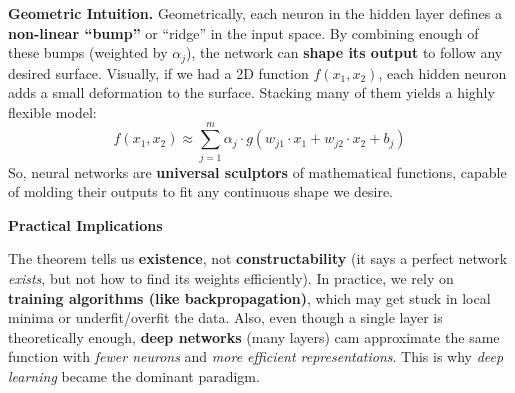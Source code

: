 \highspace
\textcolor{Green3}{ \textbf{Geometric Intuition.}} Geometrically, each neuron in the hidden layer defines a \textbf{non-linear ``bump''} or ``ridge'' in the input space. By combining enough of these bumps (weighted by $\alpha_{j}$), the network can \textbf{shape its output} to follow any desired surface. Visually, if we had a 2D function $f(x_1, x_2)$, each hidden neuron adds a small deformation to the surface. Stacking many of them yields a highly flexible model:
\begin{equation*}
    f(x_1, x_2) \approx \sum_{j=1}^{m} \alpha_{j} \cdot g\left(w_{j1} \cdot x_1 + w_{j2} \cdot x_2 + b_{j}\right)
\end{equation*}
So, neural networks are \textbf{universal sculptors} of mathematical functions, capable of molding their outputs to fit any continuous shape we desire.

\highspace
\begin{flushleft}
    \textcolor{Green3}{ \textbf{Practical Implications}}
\end{flushleft}
The theorem tells us \textbf{existence}, not \textbf{constructability} (it says a perfect network \emph{exists}, but not how to find its weights efficiently). In practice, we rely on \textbf{training algorithms (like backpropagation)}, which may get stuck in local minima or underfit/overfit the data. Also, even though a single layer is theoretically enough, \textbf{deep networks} (many layers) cam approximate the same function with \emph{fewer neurons} and \emph{more efficient representations}. This is why \emph{deep learning} became the dominant paradigm.

